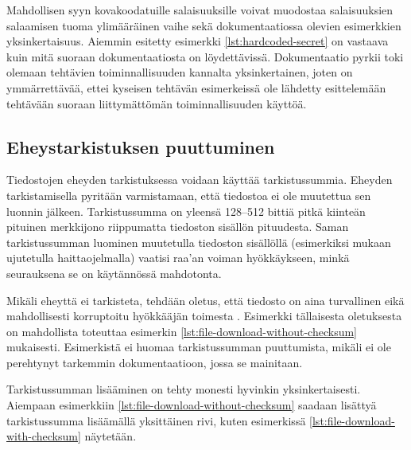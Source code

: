 

Mahdollisen syyn kovakoodatuille salaisuuksille voivat muodostaa salaisuuksien salaamisen
tuoma ylimääräinen vaihe sekä dokumentaatiossa olevien esimerkkien yksinkertaisuus. Aiemmin
esitetty esimerkki \ref{lst:hardcoded-secret} on vastaava kuin mitä suoraan dokumentaatiosta
\parencite{AnsibleDocs} on löydettävissä. Dokumentaatio pyrkii toki olemaan tehtävien
toiminnallisuuden kannalta yksinkertainen, joten on ymmärrettävää, ettei kyseisen tehtävän
esimerkeissä ole lähdetty esittelemään tehtävään suoraan liittymättömän toiminnallisuuden
käyttöä.

\subsection{Eheystarkistuksen puuttuminen}

Tiedostojen eheyden tarkistuksessa voidaan käyttää tarkistussummia. Eheyden tarkistamisella
pyritään varmistamaan, että tiedostoa ei ole muutettua sen luonnin jälkeen. Tarkistussumma
on yleensä 128–512 bittiä pitkä kiinteän pituinen merkkijono riippumatta tiedoston sisällön
pituudesta. Saman tarkistussumman luominen muutetulla tiedoston sisällöllä (esimerkiksi
mukaan ujutetulla haittaojelmalla) vaatisi raa'an voiman hyökkäykseen, minkä seurauksena se
on käytännössä mahdotonta. \parencite{MeylanAlexandre2020ASot}

Mikäli eheyttä ei tarkisteta, tehdään oletus, että tiedosto on aina turvallinen eikä
mahdollisesti korruptoitu hyökkääjän toimesta \parencite{RahmanAkond2021SSiA}. Esimerkki
tällaisesta oletuksesta on mahdollista toteuttaa esimerkin
\ref{lst:file-download-without-checksum} mukaisesti. Esimerkistä ei huomaa tarkistussumman
puuttumista, mikäli ei ole perehtynyt tarkemmin dokumentaatioon, jossa se mainitaan.



Tarkistussumman lisääminen on tehty monesti hyvinkin yksinkertaisesti. Aiempaan esimerkkiin
\ref{lst:file-download-without-checksum} saadaan lisättyä tarkistussumma lisäämällä
yksittäinen rivi, kuten esimerkissä \ref{lst:file-download-with-checksum} näytetään.

